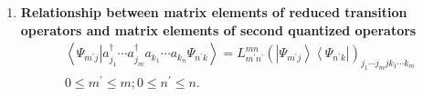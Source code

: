 \documentclass[aps,preprint]{revtex4}
\newtheorem{example}[theorem]{Example}
\begin{document}
\begin{enumerate}
\begin{example}
\begin{enumerate}
\begin{enumerate}
\item and \textbf{notably} 
\begin{equation}
\frame{$\left\langle \left. \Psi _{m^{\prime }j}\right\vert \Gamma
^{-1}\left( \left\vert \varphi _{j_{1}}\cdots \varphi _{j_{m^{\prime
}}}\right\rangle \left\langle \varphi _{k_{1}}\cdots \varphi _{k_{n^{\prime
}}}\right\vert \right) \Psi _{n^{\prime }k}\right\rangle =L_{m^{\prime
}n^{\prime }}^{mn}\left( \left\vert \Psi _{m^{\prime }j}\right\rangle
\left\langle \Psi _{n^{\prime }k}\right\vert \right) _{j_{1}\cdots
j_{m}jk_{1}\cdots k_{m}}$}
\end{equation}
\end{enumerate}
\end{enumerate}
\end{example}

\item \textbf{Relationship between matrix elements of reduced transition
operators and matrix elements of second quantized operators} 
\begin{gather}
\left\langle \left. \Psi _{m^{\prime }j}\right\vert a_{j_{1}}^{\dagger
}\cdots a_{j_{m}}^{\dagger }a_{k_{1}}\cdots a_{k_{n}}\Psi _{n^{\prime
}k}\right\rangle =L_{m^{\prime }n^{\prime }}^{mn}\left( \left\vert \Psi
_{m^{\prime }j}\right\rangle \left\langle \Psi _{n^{\prime }k}\right\vert
\right) _{j_{1}\cdots j_{m}jk_{1}\cdots k_{m}} \\
0\leq m^{\prime }\leq m;0\leq n^{\prime }\leq n.
\end{gather}


\end{enumerate}
\end{document}
